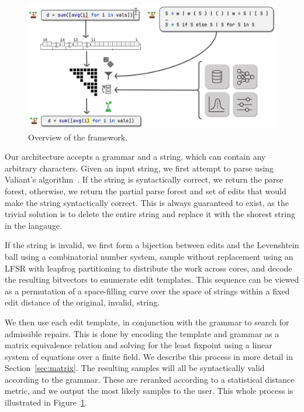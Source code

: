 \documentclass[sigplan,review,anonymous,acmsmall]{acmart}\settopmatter{printfolios=false,printccs=false,printacmref=false}
\begin{document}
\begin{figure}[t]
  \centering
  \includegraphics[width=0.9\linewidth]{../figures/architecture_overview.png}
  \caption{Overview of the framework.}
  \label{fig:overview}
\end{figure}

Our architecture accepts a grammar and a string, which can contain any arbitrary characters. Given an input string, we first attempt to parse using Valiant's algorithm~\cite{valiant1979completeness}. If the string is syntactically correct, we return the parse forest, otherwise, we return the partial parse forest and set of edits that would make the string syntactically correct. This is always guaranteed to exist, as the trivial solution is to delete the entire string and replace it with the shorest string in the langauge.

If the string is invalid, we first form a bijection between edits and the Levenshtein ball using a combinatorial number system, sample without replacement using an LFSR with leapfrog partitioning to distribute the work across cores, and decode the resulting bitvectors to enumerate edit templates. This sequence can be viewed as a permutation of a space-filling curve over the space of strings within a fixed edit distance of the original, invalid, string.

We then use each edit template, in conjunction with the grammar to search for admissible repairs. This is done by encoding the template and grammar as a matrix equivalence relation and solving for the least fixpoint using a linear system of equations over a finite field. We describe this process in more detail in Section~\ref{sec:matrix}. The resulting samples will all be syntactically valid according to the grammar. These are reranked according to a statistical distance metric, and we output the most likely samples to the user. This whole process is illustrated in Figure~\ref{fig:overview}.
\end{document}
